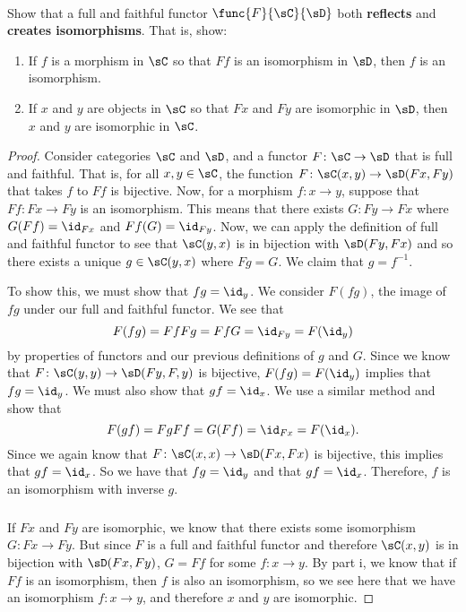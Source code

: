 \documentclass[main.tex]{subfiles}
\begin{document}
\paragraph{}
\begin{exercise}
	Show that a full and faithful functor \(\func{F}{\sC}{\sD}\) both
	\textbf{reflects} and \textbf{creates isomorphisms}. That is, show:
	\begin{enumerate}
		\item If \(f\) is a morphism in \(\sC\) so that \(Ff\) is an isomorphism
			in \(\sD\), then \(f\) is an isomorphism.

		\item If \(x\) and \(y\) are objects in \(\sC\) so that \(Fx\) and
			\(Fy\) are isomorphic in \(\sD\), then \(x\) and \(y\) are
			isomorphic in \(\sC\).
	\end{enumerate}
\end{exercise}
\begin{proof}
	Consider categories $\sC$ and $\sD$, and a functor $F\colon \sC \rightarrow \sD$ that is
	full and faithful. That is, for all $x,y \in \sC$, the function $F\colon \sC(x,y)
	\rightarrow \sD(Fx,Fy)$ that takes $f$ to $Ff$ is bijective. Now, for a
	morphism $f\colon x\rightarrow y$, suppose that $Ff\colon Fx \rightarrow Fy$ is an
	isomorphism. This means that there exists $G\colon Fy \rightarrow Fx$ where
	$G(Ff) = \id_{Fx}$ and $Ff(G) = \id_{Fy}$. Now, we can apply the definition of
	full and faithful functor to see that $\sC(y,x)$ is in bijection with
	$\sD(Fy,Fx)$ and so there exists a unique $g \in \sC(y,x)$ where $Fg = G$. We
	claim that $g = f^{-1}$.

	To show this, we must show that $fg = \id_y$. We consider $F(fg)$, the image
	of $fg$ under our full and faithful functor. We see that
	$$ F(fg) = FfFg = FfG = \id_{Fy} = F(\id_y)$$
	by properties of functors and our previous definitions of $g$ and $G$. Since
	we know that $F\colon \sC(y,y) \rightarrow \sD(Fy,F,y)$ is bijective, $F(fg) =
	F(\id_y)$ implies that $fg = \id_y$. We must also show that $gf = \id_x$. We
	use a similar method and show that
	$$F(gf) = FgFf = G(Ff) = \id_{Fx} = F(\id_x).$$
	Since we again know that $F\colon \sC(x,x) \rightarrow \sD(Fx,Fx)$ is bijective, this
	implies that $gf = \id_x$. So we have that $fg = \id_y$ and that $gf = \id_x$.
	Therefore, $f$ is an isomorphism with inverse $g$.

	\subparagraph{}
	If $Fx$ and $Fy$ are isomorphic, we know that there exists
	some isomorphism $G\colon Fx \rightarrow Fy$. But since $F$ is a full and
	faithful functor and therefore $\sC(x,y)$ is in bijection with $\sD(Fx,Fy)$, $G
	= Ff$ for some $f\colon x \rightarrow y$. By part i, we know that if $Ff$ is an
	isomorphism, then $f$ is also an isomorphism, so we see here that we have an
	isomorphism $f\colon x \rightarrow y$, and therefore $x$ and $y$ are isomorphic.
\end{proof}
\end{document}
